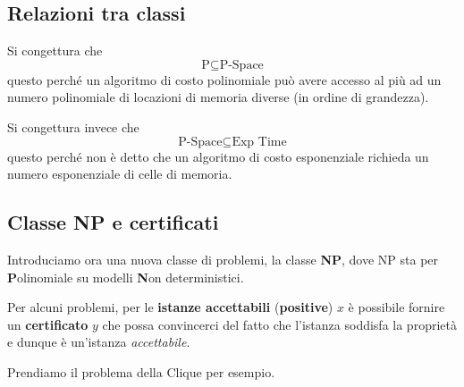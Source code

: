 \subsection{Relazioni tra classi}
Si congettura che
\[ \text{P} \subseteq \text{P-Space} \]
questo perch\'e un algoritmo di costo polinomiale pu\`o avere accesso al pi\`u ad un numero polinomiale di locazioni di
memoria diverse (in ordine di grandezza).

Si congettura invece che
\[ \text{P-Space} \subseteq \text{Exp Time} \]
questo perch\'e non \`e detto che un algoritmo di costo esponenziale richieda un numero esponenziale di celle di memoria.

\subsection{Classe NP e certificati}
Introduciamo ora una nuova classe di problemi, la classe \textbf{NP}, dove NP sta per \textbf{P}olinomiale su modelli
\textbf{N}on deterministici.

Per alcuni problemi, per le \textbf{istanze accettabili} (\textbf{positive}) $x$ \`e possibile fornire un
\textbf{certificato} $y$ che possa convincerci del fatto che l'istanza soddisfa la propriet\`a e dunque \`e un'istanza
\emph{accettabile}.

\begin{example}
	Prendiamo il problema della Clique per esempio.
\end{example}